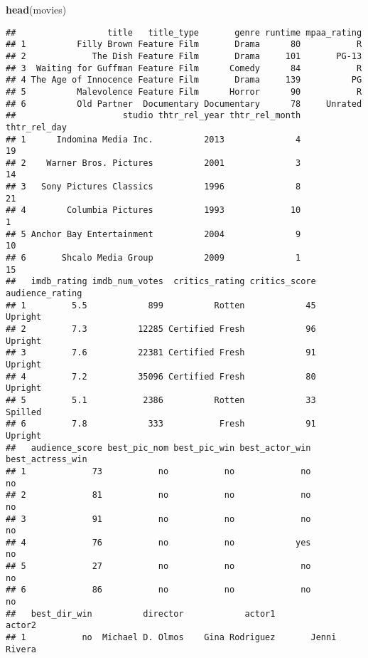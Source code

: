 \documentclass[]{article}
\newenvironment{Shaded}{\begin{snugshade}}{\end{snugshade}}
\newcommand{\KeywordTok}[1]{\textcolor[rgb]{0.13,0.29,0.53}{\textbf{#1}}}
\newcommand{\NormalTok}[1]{#1}
\begin{document}
\begin{Shaded}
\begin{Highlighting}[]
\KeywordTok{head}\NormalTok{(movies)}
\end{Highlighting}
\end{Shaded}

\begin{verbatim}
##                  title   title_type       genre runtime mpaa_rating
## 1          Filly Brown Feature Film       Drama      80           R
## 2             The Dish Feature Film       Drama     101       PG-13
## 3  Waiting for Guffman Feature Film      Comedy      84           R
## 4 The Age of Innocence Feature Film       Drama     139          PG
## 5          Malevolence Feature Film      Horror      90           R
## 6          Old Partner  Documentary Documentary      78     Unrated
##                     studio thtr_rel_year thtr_rel_month thtr_rel_day
## 1      Indomina Media Inc.          2013              4           19
## 2    Warner Bros. Pictures          2001              3           14
## 3   Sony Pictures Classics          1996              8           21
## 4        Columbia Pictures          1993             10            1
## 5 Anchor Bay Entertainment          2004              9           10
## 6       Shcalo Media Group          2009              1           15
##   imdb_rating imdb_num_votes  critics_rating critics_score audience_rating
## 1         5.5            899          Rotten            45         Upright
## 2         7.3          12285 Certified Fresh            96         Upright
## 3         7.6          22381 Certified Fresh            91         Upright
## 4         7.2          35096 Certified Fresh            80         Upright
## 5         5.1           2386          Rotten            33         Spilled
## 6         7.8            333           Fresh            91         Upright
##   audience_score best_pic_nom best_pic_win best_actor_win best_actress_win
## 1             73           no           no             no               no
## 2             81           no           no             no               no
## 3             91           no           no             no               no
## 4             76           no           no            yes               no
## 5             27           no           no             no               no
## 6             86           no           no             no               no
##   best_dir_win          director            actor1             actor2
## 1           no  Michael D. Olmos    Gina Rodriguez       Jenni Rivera

\end{verbatim}
\end{document}
